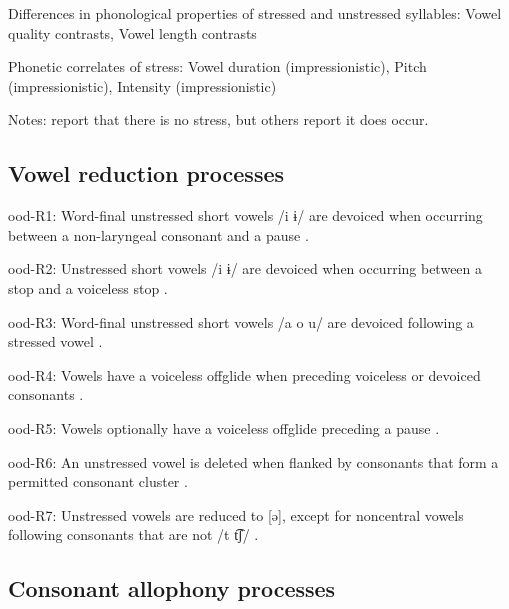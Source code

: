 {\begin{appendixdesc}
\item[Differences in phonological properties of stressed and unstressed syllables:] Vowel quality contrasts, Vowel length contrasts

\item[Phonetic correlates of stress:] Vowel duration (impressionistic), Pitch (impressionistic), Intensity (impressionistic)

\item[Notes:] \citet{DoloresMathiot1991} report that there is no stress, but others report it does occur.
\end{appendixdesc}
\subsection*{Vowel reduction processes}
\begin{appendixdesc}

\item[ood-R1:] Word-final unstressed short vowels /i ɨ/ are devoiced when occurring between a non-laryngeal consonant and a pause \citep[31]{Saxton1963}.

\item[ood-R2:] Unstressed short vowels /i ɨ/ are devoiced when occurring between a stop and a voiceless stop \citep[31]{Saxton1963}.

\item[ood-R3:] Word-final unstressed short vowels /a o u/ are devoiced following a stressed vowel \citep[31]{Saxton1963}.

\item[ood-R4:] Vowels have a voiceless offglide when preceding voiceless or devoiced consonants \citep[31]{Saxton1963}.

\item[ood-R5:] Vowels optionally have a voiceless offglide preceding a pause \citep[31]{Saxton1963}.

\item[ood-R6:] An unstressed vowel is deleted when flanked by consonants that form a permitted consonant cluster \citep[103]{Saxton1982}.

\item[ood-R7:] Unstressed vowels are reduced to [ə], except for noncentral vowels following consonants that are not /t t͡ʃ/ \citep[104]{Saxton1982}.
\end{appendixdesc}
\subsection*{Consonant allophony processes}
\begin{appendixdesc}


\end{appendixdesc}}
